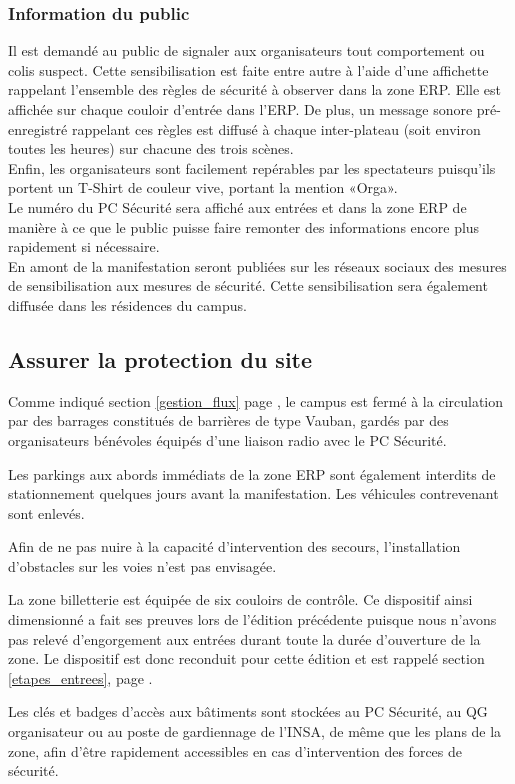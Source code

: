 \documentclass[hidelinks, paper=a4, fontsize=13pt]{report}
\begin{document}
\subsubsection{Information du public}
Il est demandé au public de signaler aux organisateurs tout comportement ou colis suspect. Cette sensibilisation est faite entre autre à l'aide d'une affichette rappelant l’ensemble des règles de sécurité à observer dans la zone ERP. Elle est affichée sur chaque couloir d’entrée dans l’ERP. De plus, un message sonore pré-enregistré rappelant ces règles est diffusé à chaque inter-plateau (soit environ toutes les heures) sur chacune des trois scènes.\\

Enfin, les organisateurs sont facilement repérables par les spectateurs puisqu’ils portent un T-Shirt de couleur vive, portant la mention «Orga». \\
Le numéro du PC Sécurité sera affiché aux entrées et dans la zone ERP de manière à ce que le public puisse faire remonter des informations encore plus rapidement si nécessaire. \\

En amont de la manifestation seront publiées sur les réseaux sociaux des mesures de sensibilisation aux mesures de sécurité. Cette sensibilisation sera également diffusée dans les résidences du campus.

\subsection{Assurer la protection du site}
\begin{list}{•}{}
	\item Comme indiqué section \ref{gestion_flux} page \pageref{gestion_flux}, le campus est fermé à la circulation par des barrages constitués de barrières de type Vauban, gardés par des organisateurs bénévoles équipés d'une liaison radio avec le PC Sécurité.
	\item Les parkings aux abords immédiats de la zone ERP sont également interdits de stationnement quelques jours avant la manifestation. Les véhicules contrevenant sont enlevés.
	\item Afin de ne pas nuire à la capacité d'intervention des secours, l'installation d'obstacles sur les voies n'est pas envisagée.
	\item La zone billetterie est équipée de six couloirs de contrôle. Ce dispositif ainsi dimensionné a fait ses preuves lors de l'édition précédente puisque nous n'avons pas relevé d'engorgement aux entrées durant toute la durée d'ouverture de la zone. Le dispositif est donc reconduit pour cette édition et est rappelé section \ref{etapes_entrees}, page \pageref{etapes_entrees}.
	\item Les clés et badges d'accès aux bâtiments sont stockées au PC Sécurité, au QG organisateur ou au poste de gardiennage de l'INSA, de même que les plans de la zone, afin d'être rapidement accessibles en cas d'intervention des forces de sécurité.
\end{list}
\end{document}
